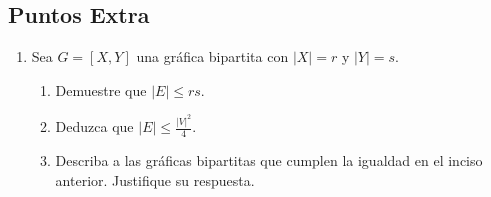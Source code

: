 \documentclass{article}
\begin{document}
\subsection*{Puntos Extra}

\begin{enumerate}
  \item Sea $G = [X, Y]$ una gr\'afica bipartita con $|X| = r$ y $|Y| = s$.
    \begin{enumerate}
      \item Demuestre que $|E| \le rs$.

      \item Deduzca que $|E| \le \frac{|V|^2}{4}$.

      \item Describa a las gr\'aficas bipartitas que cumplen la igualdad en el
        inciso anterior. Justifique su respuesta.
    \end{enumerate}

\end{enumerate}
\end{document}
